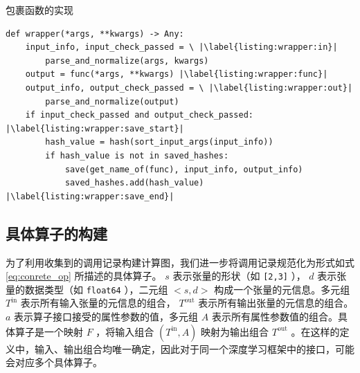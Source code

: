 \begin{listing}[]
    \caption{包裹函数的实现}
    \label{listing:wrapper}
\begin{verbatim}
def wrapper(*args, **kwargs) -> Any:
    input_info, input_check_passed = \ |\label{listing:wrapper:in}|
        parse_and_normalize(args, kwargs)
    output = func(*args, **kwargs) |\label{listing:wrapper:func}|
    output_info, output_check_passed = \ |\label{listing:wrapper:out}|
        parse_and_normalize(output)
    if input_check_passed and output_check_passed: |\label{listing:wrapper:save_start}|
        hash_value = hash(sort_input_args(input_info))
        if hash_value is not in saved_hashes:
            save(get_name_of(func), input_info, output_info)
            saved_hashes.add(hash_value) |\label{listing:wrapper:save_end}|
\end{verbatim}
\end{listing}



    

\subsection{具体算子的构建}

为了利用收集到的调用记录构建计算图，我们进一步将调用记录规范化为形式如式 \eqref{eq:conrete_op} 所描述的具体算子。 $s$ 表示张量的形状（如 \texttt{[2,3]} ）， $d$ 表示张量的数据类型（如 \texttt{float64} ），二元组 $<s, d>$ 构成一个张量的元信息。多元组 $T^\text{in}$ 表示所有输入张量的元信息的组合， $T^\text{out}$ 表示所有输出张量的元信息的组合。 $a$ 表示算子接口接受的属性参数的值，多元组 $A$ 表示所有属性参数值的组合。具体算子是一个映射 $F$ ，将输入组合 $(T^\text{in}, A)$ 映射为输出组合 $T^\text{out}$ 。在这样的定义中，输入、输出组合均唯一确定，因此对于同一个深度学习框架中的接口，可能会对应多个具体算子。

